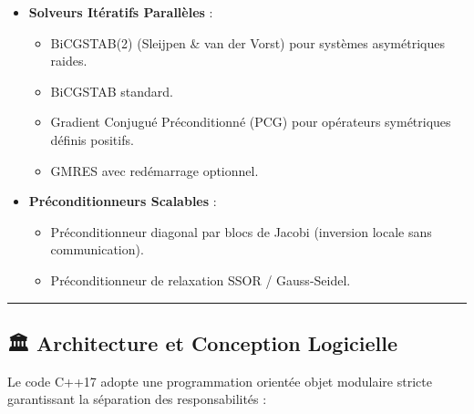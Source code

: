 \documentclass[
  french,
]{article}
\providecommand{\tightlist}{%
  \setlength{\itemsep}{0pt}\setlength{\parskip}{0pt}}
\begin{document}
\begin{itemize}
\tightlist
\item
  \textbf{Solveurs Itératifs Parallèles} :

  \begin{itemize}
  \tightlist
  \item
    BiCGSTAB(2) (Sleijpen \& van der Vorst) pour systèmes asymétriques
    raides.
  \item
    BiCGSTAB standard.
  \item
    Gradient Conjugué Préconditionné (PCG) pour opérateurs symétriques
    définis positifs.
  \item
    GMRES avec redémarrage optionnel.
  \end{itemize}
\item
  \textbf{Préconditionneurs Scalables} :

  \begin{itemize}
  \tightlist
  \item
    Préconditionneur diagonal par blocs de Jacobi (inversion locale sans
    communication).
  \item
    Préconditionneur de relaxation SSOR / Gauss-Seidel.
  \end{itemize}
\end{itemize}

\begin{center}\rule{0.5\linewidth}{0.5pt}\end{center}

\subsection{🏛 Architecture et Conception
Logicielle}\label{architecture-et-conception-logicielle}

Le code C++17 adopte une programmation orientée objet modulaire stricte
garantissant la séparation des responsabilités :
\end{document}
